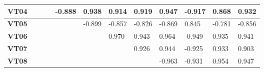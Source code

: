 \documentclass{article}
\begin{document}
\begin{table}[]
\begin{tabular}{|c|l|l|l|l|l|l|l|l|l|l|l|}
\textbf{VT04}         & \cellcolor[HTML]{C0C0C0}           & \cellcolor[HTML]{C0C0C0}           & \cellcolor[HTML]{C0C0C0}{\color[HTML]{C0C0C0} } & -0.888                                          & 0.938                                           & 0.914                                           & 0.919                              & 0.947                              & -0.917                             & 0.868                              & 0.932                              \\ \hline
\textbf{VT05}         & \cellcolor[HTML]{C0C0C0}           & \cellcolor[HTML]{C0C0C0}           & \cellcolor[HTML]{C0C0C0}{\color[HTML]{C0C0C0} } & \cellcolor[HTML]{C0C0C0}                        & -0.899                                          & -0.857                                          & -0.826                             & -0.869                             & 0.845                              & -0.781                             & -0.856                             \\ \hline
\textbf{VT06}         & \cellcolor[HTML]{C0C0C0}           & \cellcolor[HTML]{C0C0C0}           & \cellcolor[HTML]{C0C0C0}{\color[HTML]{C0C0C0} } & \cellcolor[HTML]{C0C0C0}                        & \cellcolor[HTML]{C0C0C0}                        & 0.970                                           & 0.943                              & 0.964                              & -0.949                             & 0.935                              & 0.941                              \\ \hline
\textbf{VT07}         & \cellcolor[HTML]{C0C0C0}           & \cellcolor[HTML]{C0C0C0}           & \cellcolor[HTML]{C0C0C0}{\color[HTML]{C0C0C0} } & \cellcolor[HTML]{C0C0C0}{\color[HTML]{C0C0C0} } & \cellcolor[HTML]{C0C0C0}{\color[HTML]{C0C0C0} } & \cellcolor[HTML]{C0C0C0}{\color[HTML]{C0C0C0} } & 0.926                              & 0.944                              & -0.925                             & 0.933                              & 0.903                              \\ \hline
\textbf{VT08}         & \cellcolor[HTML]{C0C0C0}           & \cellcolor[HTML]{C0C0C0}           & \cellcolor[HTML]{C0C0C0}{\color[HTML]{C0C0C0} } & \cellcolor[HTML]{C0C0C0}{\color[HTML]{C0C0C0} } & \cellcolor[HTML]{C0C0C0}{\color[HTML]{C0C0C0} } & \cellcolor[HTML]{C0C0C0}{\color[HTML]{C0C0C0} } & \cellcolor[HTML]{C0C0C0}           & -0.963                             & -0.931                             & 0.954                              & 0.947                              \\ \hline

\end{tabular}
\end{table}
\end{document}

